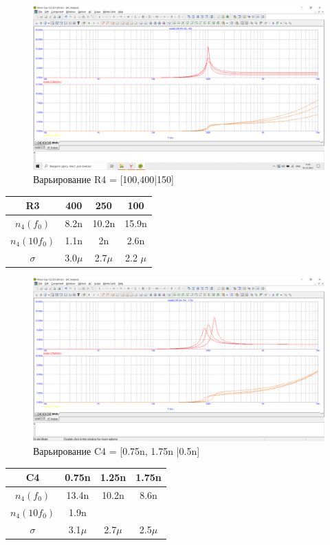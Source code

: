 \documentclass[a4paper, 12pt]{article}%
\begin{document}
\begin{figure}[h!]
    \centering
    \includegraphics[scale = 0.4 \textwidth]{images/mod3_4_2_1.png}
    \caption{Варьирование R4 = [100,400|150]}
    \label{fig:m3421}
\end{figure}


\begin{tabular}{|c|c|c|c|}
    R3 & 400 & 250 & 100\\ \hline
    $n_4(f_0)$ & 8.2n & 10.2n & 15.9n\\ \hline
    $n_4(10 f_0)$ & 1.1n & 2n & 2.6n\\ \hline
    $\sigma$ & 3.0$\mu$ & 2.7$\mu$ & 2.2 $\mu$ \\ \hline
\end{tabular}

\begin{figure}[h!]
    \centering
    \includegraphics[scale = 0.4 \textwidth]{images/mod3_4_2_2.png}
    \caption{Варьирование C4 = [0.75n, 1.75n |0.5n]}
    \label{fig:m3422}
\end{figure}

\begin{tabular}{|c|c|c|c|}
    C4 & 0.75n & 1.25n & 1.75n\\ \hline
    $n_4(f_0)$ & 13.4n & 10.2n & 8.6n\\ \hline
    $n_4(10 f_0)$ & 1.9n &  & \\ \hline
    $\sigma$ & 3.1$\mu$ & 2.7$\mu$ & 2.5$\mu$\\ \hline
\end{tabular}
\end{document}
